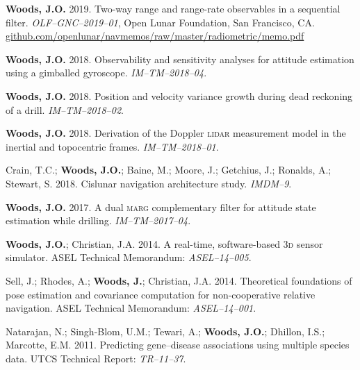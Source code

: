 \documentclass[12pt,letterpaper]{article}
\begin{document}
\medskip
\par\textbf{Woods, J.O.} 2019. Two-way range and range-rate observables in a sequential filter. \textit{OLF--GNC--2019--01}, Open Lunar Foundation, San Francisco, CA. \href{https://github.com/openlunar/navmemos/raw/master/radiometric/memo.pdf}{github.com/openlunar/navmemos/raw/master/radiometric/memo.pdf}

\medskip
\par\textbf{Woods, J.O.} 2018. Observability and sensitivity analyses for attitude estimation using a gimballed gyroscope. \textit{IM--TM--2018--04}.

\medskip
\par \textbf{Woods, J.O.} 2018. Position and velocity variance growth during dead reckoning of a drill. \textit{IM--TM--2018--02}.

\medskip
\par \textbf{Woods, J.O.} 2018. Derivation of the Doppler \textsc{lidar} measurement model in the inertial and topocentric frames. \textit{IM--TM--2018--01}.

\medskip
\par Crain, T.C.; \textbf{Woods, J.O.}; Baine, M.; Moore, J.; Getchius, J.; Ronalds, A.; Stewart, S. 2018. Cislunar navigation architecture study. \textit{IMDM--9}.

\medskip
\par \textbf{Woods, J.O.} 2017. A dual \textsc{marg} complementary filter for attitude state estimation while drilling. \textit{IM--TM--2017--04}.

\medskip
\par \textbf{Woods, J.O.}; Christian, J.A. 2014. A real-time, software-based \textsc{3d} sensor simulator. ASEL Technical Memorandum: \textit{ASEL--14--005}.

\medskip
\par Sell, J.; Rhodes, A.; \textbf{Woods, J.}; Christian, J.A. 2014. Theoretical foundations of pose estimation and covariance computation for non-cooperative relative navigation. ASEL Technical Memorandum: \textit{ASEL--14--001}.

\medskip
\par Natarajan, N.; Singh-Blom, U.M.; Tewari, A.; \textbf{Woods, J.O.}; Dhillon, I.S.; Marcotte, E.M. 2011. Predicting gene--disease associations using multiple species data. UTCS Technical Report: \textit{TR--11--37}.
\end{document}
